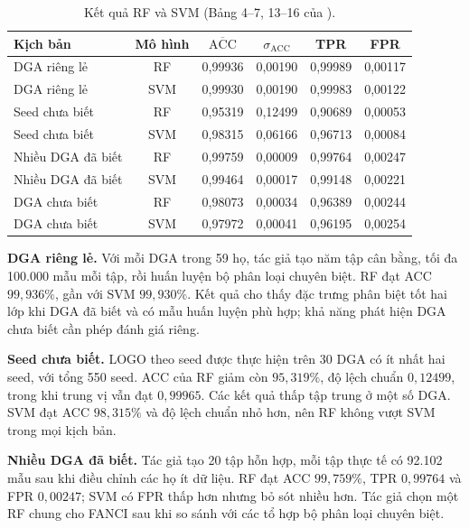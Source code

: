 \begin{table}[H]
\centering
\caption{Kết quả RF và SVM (Bảng 4--7, 13--16 của \cite{schuppen2018fanci}).}
\label{tab:c4-accuracy}
\small
\setlength{\tabcolsep}{5pt}
\begin{tabularx}{\textwidth}{|>{\raggedright\arraybackslash}X|c|c|c|c|c|}
\hline
\rowcolor{LightCyan}
\textbf{Kịch bản} & \textbf{Mô hình} & $\overline{\mathrm{ACC}}$ & $\sigma_{\mathrm{ACC}}$ & \textbf{TPR} & \textbf{FPR} \\ \hline
DGA riêng lẻ & RF & 0,99936 & 0,00190 & 0,99989 & 0,00117 \\ \hline
DGA riêng lẻ & SVM & 0,99930 & 0,00190 & 0,99983 & 0,00122 \\ \hline
Seed chưa biết & RF & 0,95319 & 0,12499 & 0,90689 & 0,00053 \\ \hline
Seed chưa biết & SVM & 0,98315 & 0,06166 & 0,96713 & 0,00084 \\ \hline
Nhiều DGA đã biết & RF & 0,99759 & 0,00009 & 0,99764 & 0,00247 \\ \hline
Nhiều DGA đã biết & SVM & 0,99464 & 0,00017 & 0,99148 & 0,00221 \\ \hline
DGA chưa biết & RF & 0,98073 & 0,00034 & 0,96389 & 0,00244 \\ \hline
DGA chưa biết & SVM & 0,97972 & 0,00041 & 0,96195 & 0,00254 \\ \hline
\end{tabularx}
\end{table}

\textbf{DGA riêng lẻ.} Với mỗi DGA trong 59 họ, tác giả tạo năm tập cân bằng, tối đa 100.000 mẫu mỗi tập, rồi huấn luyện bộ phân loại chuyên biệt. RF đạt ACC $99{,}936\%$, gần với SVM $99{,}930\%$. Kết quả cho thấy đặc trưng phân biệt tốt hai lớp khi DGA đã biết và có mẫu huấn luyện phù hợp; khả năng phát hiện DGA chưa biết cần phép đánh giá riêng.

\textbf{Seed chưa biết.} LOGO theo seed được thực hiện trên 30 DGA có ít nhất hai seed, với tổng 550 seed. ACC của RF giảm còn $95{,}319\%$, độ lệch chuẩn $0{,}12499$, trong khi trung vị vẫn đạt $0{,}99965$. Các kết quả thấp tập trung ở một số DGA. SVM đạt ACC $98{,}315\%$ và độ lệch chuẩn nhỏ hơn, nên RF không vượt SVM trong mọi kịch bản.

\textbf{Nhiều DGA đã biết.} Tác giả tạo 20 tập hỗn hợp, mỗi tập thực tế có 92.102 mẫu sau khi điều chỉnh các họ ít dữ liệu. RF đạt ACC $99{,}759\%$, TPR $0{,}99764$ và FPR $0{,}00247$; SVM có FPR thấp hơn nhưng bỏ sót nhiều hơn. Tác giả chọn một RF chung cho FANCI sau khi so sánh với các tổ hợp bộ phân loại chuyên biệt.

